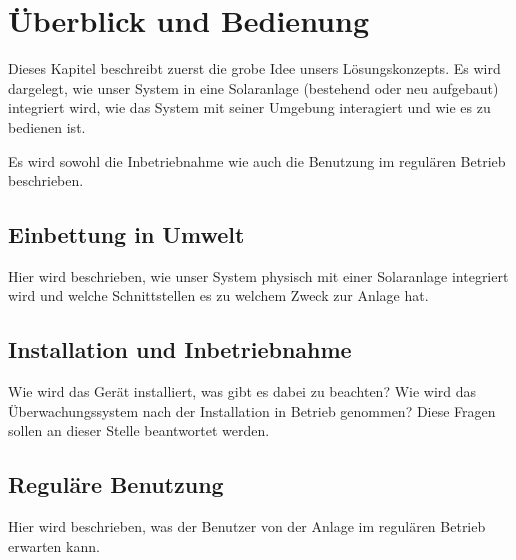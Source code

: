 \chapter{\"Uberblick und Bedienung}
\label{chap:uberblick}
Dieses Kapitel  beschreibt zuerst die grobe  Idee unsers L\"osungskonzepts. Es
wird  dargelegt, wie  unser System  in  eine Solaranlage  (bestehend oder  neu
aufgebaut) integriert wird, wie das System mit seiner Umgebung interagiert und
wie es zu bedienen ist.

Es  wird sowohl  die  Inbetriebnahme  wie auch  die  Benutzung im  regul\"aren
Betrieb beschrieben.


\section{Einbettung in Umwelt}
\label{sec:einbettung}

Hier  wird  beschrieben,  wie  unser System  physisch  mit  einer  Solaranlage
integriert wird und welche Schnittstellen es zu welchem Zweck zur Anlage hat.


\section{Installation und Inbetriebnahme}
\label{sec:installation}

Wie wird das Ger\"at installiert, was  gibt es dabei zu beachten? Wie wird das
\"Uberwachungssystem nach  der Installation in Betrieb  genommen? Diese Fragen
sollen an dieser Stelle beantwortet werden.


\section{Regul\"are Benutzung}
\label{sec:regular}

Hier wird beschrieben, was der Benutzer  von der Anlage im regul\"aren Betrieb
erwarten kann.
